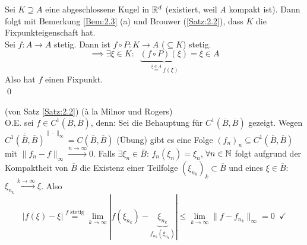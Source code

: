 \documentclass[a4paper]{article}
\begin{document}
\begin{Beweis}
Sei $K\supseteq A$ eine abgeschlossene Kugel in $\mathbb R^d$ (existiert, weil $A$ kompakt ist). Dann folgt mit Bemerkung \ref{Bem:2.3} (a) und Brouwer (\ref{Satz:2.2}), dass $K$ die Fixpunkteigenschaft hat.\\
Sei $f\colon A\to A$ stetig. Dann ist $f\circ P\colon K\to A$ ($\subseteq K$) stetig. 
\[\implies \exists \xi\in K:\;\; \underbrace{(f\circ P)(\xi)}_{\overset{\xi\in A}{=}f(\xi)}=\xi\in A\]
Also hat $f$ einen Fixpunkt.\\\qed
\end{Beweis}
\begin{Beweis}
(von Satz \ref{Satz:2.2}) (\`{a} la Milnor und Rogers)\\
O.E. sei $f\in C^1(\overline{B},\overline{B})$, denn: Sei die Behauptung für $C^1(\overline B,\overline{B})$ gezeigt. Wegen $\overline{C^1(\overline{B},\overline{B})}^{\|\cdot\|_{\infty}}=C(\overline{B},\overline{B})$ (Übung) gibt es eine Folge $(f_n)_n\subseteq C^1(\overline{B},\overline{B})$ mit $\|f_n-f\|_{\infty}\xrightarrow{n\to\infty}0$. Falls $\exists \xi_n\in\overline{B}$: $f_n(\xi_n)=\xi_n$, $\forall n\in\operatorname{\mathbb N}$ folgt aufgrund der Kompaktheit von $\overline B$ die Existenz einer Teilfolge $(\xi_{n_k})_k\subset \overline{B}$ und eines $\xi\in \overline{B}$: $\xi_{n_k}\xrightarrow{k\to\infty}\xi$. Also
\[|f(\xi)-\xi|\overset{f\text{ stetig}}=\lim_{k\to\infty}|f(\xi_{n_k})-\underbrace{\xi_{n_k}}_{f_{n_k}(\xi_{n_k})}|\le \lim_{k\to\infty}\|f-f_{n_k}\|_{\infty}=0\;\;\checkmark\]


\end{Beweis}
\end{document}
